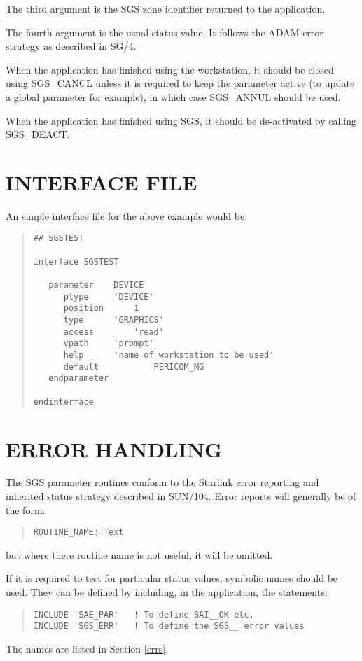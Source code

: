 The third argument is the SGS zone identifier returned to the application.

The fourth argument is the usual status value. It follows the ADAM error
strategy as described in SG/4.

When the application has finished using the workstation, it should be closed
using SGS\_CANCL unless it is required to keep the parameter active
(to update a global parameter for example), in which case SGS\_ANNUL
should be used.

When the application has finished using SGS, it should be de-activated by
calling SGS_DEACT.

\section{INTERFACE FILE}
An simple interface file for the above example would be:
\begin{quote}
\begin{verbatim}
## SGSTEST

interface SGSTEST

   parameter	DEVICE
      ptype		'DEVICE'
      position		1
      type		'GRAPHICS'
      access		'read'
      vpath		'prompt'
      help		'name of workstation to be used'
      default           PERICOM_MG
   endparameter

endinterface
\end{verbatim}
\end{quote}

\section{ERROR HANDLING}
The SGS parameter routines conform to the Starlink error reporting and
inherited status strategy described in SUN/104.
Error reports will generally be of the form:
\begin{quote}
\begin{verbatim}
ROUTINE_NAME: Text
\end{verbatim}
\end{quote}
but where there routine name is not useful, it will be omitted.

If it is required to test for particular status values, symbolic names should
be used.
They can be defined by including, in the application,  the statements:
\begin{quote}
\begin{verbatim}
INCLUDE 'SAE_PAR'   ! To define SAI__OK etc.
INCLUDE 'SGS_ERR'   ! To define the SGS__ error values
\end{verbatim}
\end{quote}
The names are listed in Section \ref{errs}.

